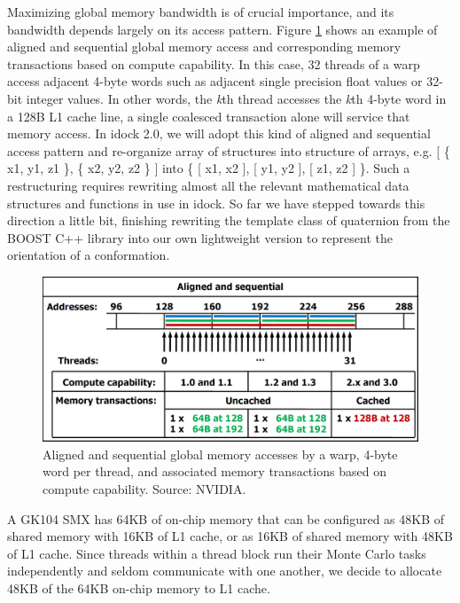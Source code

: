 Maximizing global memory bandwidth is of crucial importance, and its bandwidth depends largely on its access pattern. Figure \ref{GPU:AlignedSequentialGlobalMemoryAccess} shows an example of aligned and sequential global memory access and corresponding memory transactions based on compute capability. In this case, 32 threads of a warp access adjacent 4-byte words such as adjacent single precision float values or 32-bit integer values. In other words, the \textit{k}th thread accesses the \textit{k}th 4-byte word in a 128B L1 cache line, a single coalesced transaction alone will service that memory access. In idock 2.0, we will adopt this kind of aligned and sequential access pattern and re-organize array of structures into structure of arrays, e.g.  [ \{ x1, y1, z1 \}, \{ x2, y2, z2 \} ] into \{ [ x1, x2 ], [ y1, y2 ], [ z1, z2 ] \}. Such a restructuring requires rewriting almost all the relevant mathematical data structures and functions in use in idock. So far we have stepped towards this direction a little bit, finishing rewriting the template class of quaternion from the BOOST C++ library into our own lightweight version to represent the orientation of a conformation.

\begin{figure}
\centering
\includegraphics[width=\linewidth]{GPU/AlignedSequentialGlobalMemoryAccess.png}
\caption{Aligned and sequential global memory accesses by a warp, 4-byte word per thread, and associated memory transactions based on compute capability. Source: NVIDIA.}
\label{GPU:AlignedSequentialGlobalMemoryAccess}
\end{figure}

A GK104 SMX has 64KB of on-chip memory that can be configured as 48KB of shared memory with 16KB of L1 cache, or as 16KB of shared memory with 48KB of L1 cache. Since threads within a thread block run their Monte Carlo tasks independently and seldom communicate with one another, we decide to allocate 48KB of the 64KB on-chip memory to L1 cache.

